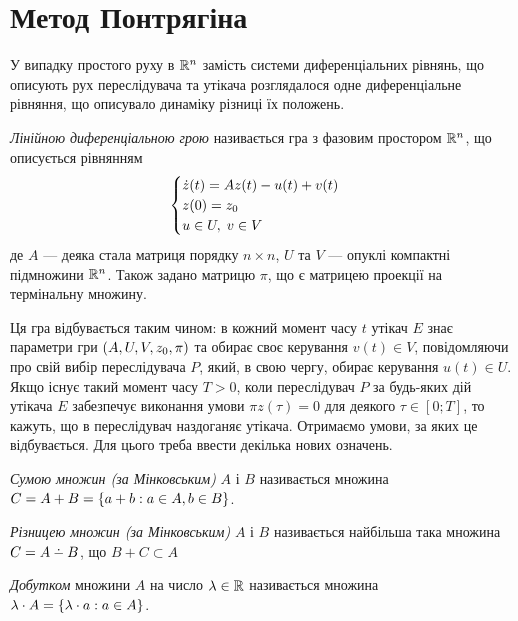 \section{Метод Понтрягіна}
У випадку простого руху в $\mathbb{R}^n$ замість системи диференціальних рівнянь,
що описують рух переслідувача та утікача розглядалося
одне диференціальне рівняння, що описувало динаміку різниці їх положень.
\begin{definition}
    \emph{Лінійною диференціальною грою} називається гра з фазовим простором
    $\mathbb{R}^n$, що описується рівнянням
    \begin{gather}\label{lin_game}
        \begin{cases}
            \dot{z}(t) = A z(t) - u(t) + v(t) \\
            z(0) = z_0 \\
            u \in U, \; v \in V
        \end{cases}
    \end{gather}
    де $A$ --- деяка стала матриця порядку $n\times n$, $U$ та $V$ --- опуклі компактні
    підмножини $\mathbb{R}^n$. Також задано матрицю $\pi$, що є матрицею проекції на термінальну множину.
\end{definition}
Ця гра відбувається таким чином: в кожний момент часу $t$ утікач $E$ знає параметри гри
$\left(A, U, V, z_0, \pi \right)$ та обирає своє керування $v(t) \in V$, повідомляючи про свій вибір
переслідувача $P$, який, в свою чергу, обирає керування $u(t) \in U$.
Якщо існує такий момент часу $T > 0$, коли переслідувач $P$ за будь-яких дій
утікача $E$ забезпечує виконання умови $\pi z(\tau) = 0$ для деякого
$\tau \in [0; T]$, то кажуть, що в переслідувач наздоганяє утікача.
Отримаємо умови, за яких це відбувається. Для цього треба ввести декілька нових означень.
\begin{definition}
    \emph{Сумою множин (за Мінковським)} $A$ і $B$ називається множина
    $C = A + B = \left\{ a + b : a \in A, b \in B\right\}$.
\end{definition}
\begin{definition}
    \emph{Різницею множин (за Мінковським)} $A$ і $B$ називається найбільша така множина
    $C = A \setdif B$, що $B + C \subset A$
\end{definition}
\begin{definition}
    \emph{Добутком} множини $A$ на число $\lambda \in \mathbb{R}$ називається множина
    $\lambda \cdot A = \left\{\lambda \cdot a : a \in A \right\}$.
\end{definition}
